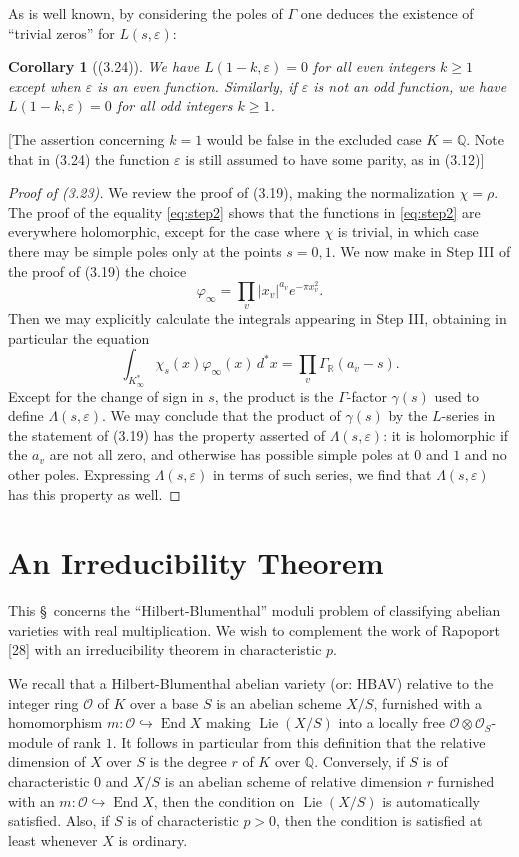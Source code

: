\documentclass[12pt,a4paper]{article}
\theoremstyle{plain}
\newtheorem{corollary}[theorem]{Corollary}
\theoremstyle{definition}
\DeclareMathOperator{\End}{End}
\DeclareMathOperator{\Lie}{Lie}
\newcommand{\OO}{\mathcal{O}}
\newcommand{\Q}{\mathbb{Q}}
\newcommand{\R}{\mathbb{R}}
\begin{document}
As is well known, by considering the poles of $\Gamma$ one deduces the existence of ``trivial zeros'' for $L(s,\varepsilon)$:

\begin{corollary}[(3.24)]\label{cor:trivial}
We have $L(1-k,\varepsilon)=0$ for all even integers $k\ge1$ except when $\varepsilon$ is an even function. Similarly, if $\varepsilon$ is not an odd function, we have $L(1-k,\varepsilon)=0$ for all odd integers $k\ge1$.
\end{corollary}

[The assertion concerning $k=1$ would be false in the excluded case $K=\Q$. Note that in (3.24) the function $\varepsilon$ is still assumed to have some parity, as in (3.12)]

\begin{proof}[Proof of (3.23)]
We review the proof of (3.19), making the normalization $\chi=\rho$. The proof of the equality \eqref{eq:step2} shows that the functions in \eqref{eq:step2} are everywhere holomorphic, except for the case where $\chi$ is trivial, in which case there may be simple poles only at the points $s=0,1$. We now make in Step III of the proof of (3.19) the choice
\[
\varphi_{\infty}=\prod_v|x_v|^{a_v}e^{-\pi x_v^2}.
\]
Then we may explicitly calculate the integrals appearing in Step III, obtaining in particular the equation
\[
\int_{K_{\infty}^*}\chi_s(x)\varphi_{\infty}(x)\,d^*x=\prod_v\Gamma_{\R}(a_v-s).
\]
Except for the change of sign in $s$, the product is the $\Gamma$-factor $\gamma(s)$ used to define $\Lambda(s,\varepsilon)$. We may conclude that the product of $\gamma(s)$ by the $L$-series in the statement of (3.19) has the property asserted of $\Lambda(s,\varepsilon)$: it is holomorphic if the $a_v$ are not all zero, and otherwise has possible simple poles at $0$ and $1$ and no other poles. Expressing $\Lambda(s,\varepsilon)$ in terms of such series, we find that $\Lambda(s,\varepsilon)$ has this property as well.
\end{proof}

\section{An Irreducibility Theorem}

This \S\ concerns the ``Hilbert-Blumenthal'' moduli problem of classifying abelian varieties with real multiplication. We wish to complement the work of Rapoport [28] with an irreducibility theorem in characteristic $p$.

We recall that a Hilbert-Blumenthal abelian variety (or: HBAV) relative to the integer ring $\OO$ of $K$ over a base $S$ is an abelian scheme $X/S$, furnished with a homomorphism $m:\OO\hookrightarrow\End X$ making $\Lie(X/S)$ into a locally free $\OO\otimes\mathcal{O}_S$-module of rank $1$. It follows in particular from this definition that the relative dimension of $X$ over $S$ is the degree $r$ of $K$ over $\Q$. Conversely, if $S$ is of characteristic $0$ and $X/S$ is an abelian scheme of relative dimension $r$ furnished with an $m:\OO\hookrightarrow\End X$, then the condition on $\Lie(X/S)$ is automatically satisfied. Also, if $S$ is of characteristic $p>0$, then the condition is satisfied at least whenever $X$ is ordinary.
\end{document}

